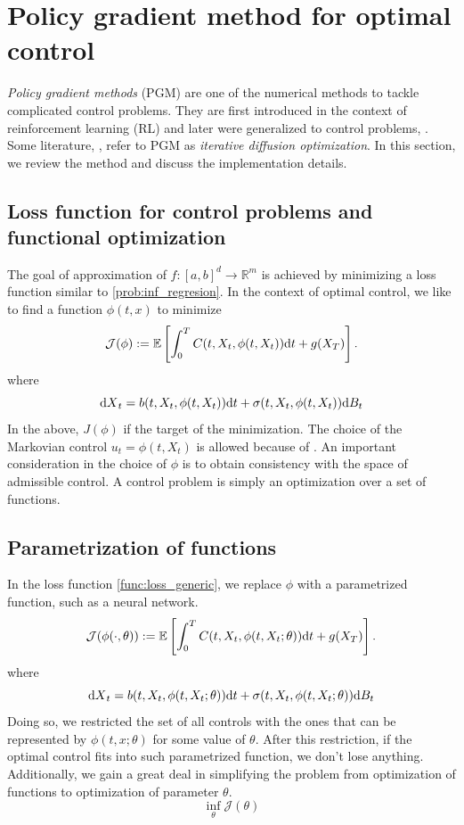 \documentclass[11pt]{book}
\newcommand{\dd}{\text{\normalfont d}}
\newcommand{\dt}{\text{\normalfont d}t}
\newcommand{\dX}{\text{\normalfont d}X}
\begin{document}
\section{Policy gradient method for optimal control}
\emph{Policy gradient methods} (PGM) are one of the numerical methods to tackle complicated control problems. They are first introduced in the context of reinforcement learning (RL) and later were generalized to control problems, \citet{Powell19}. Some literature, \citet{NR21}, refer to PGM as \emph{iterative diffusion optimization}. In this section, we review the method and discuss the implementation details. 
\subsection{Loss function for control problems and functional optimization}
The goal of  approximation of $f:[a,b]^d\to\mathbb{R}^m$ is achieved by minimizing a loss function similar to \eqref{prob:inf_regresion}. 
In the context of optimal control, we like to find a function $\phi(t,x)$ to minimize
\begin{equation}\label{func:loss_generic}
{\mathcal{J}}(\phi):=\mathbb{E}\left[\int_0^T C(t,X_t,\phi(t,X_t)){{\dt}}+g(X_T)\right].
\end{equation}
where 
\[
{\dX}_t =b(t,X_t,\phi(t,X_t)){{\dt}}+\sigma(t,X_t,\phi(t,X_t)){\dd}B_t
\]
In the above, $J(\phi)$ if the target of the minimization. The choice of the Markovian control $u_t=\phi(t,X_t)$ is allowed because of \citet{el1987compactification,haussmann1986existence}. An important consideration in the choice of $\phi$ is to obtain consistency with the space of admissible control. 
A control problem is simply an optimization over a set of functions.
\subsection{Parametrization of functions}
In the loss function \eqref{func:loss_generic}, we replace $\phi$ with a parametrized function, such as  a neural network.
\begin{equation}\label{func:loss_parametrized}
{\mathcal{J}}(\phi(\cdot,\theta)):=\mathbb{E}\left[\int_0^T C(t,X_t,\phi(t,X_t;\theta)){{\dt}}+g(X_T)\right].
\end{equation}
where 
\[
{\dX}_t =b(t,X_t,\phi(t,X_t;\theta)){{\dt}}+\sigma(t,X_t,\phi(t,X_t;\theta)){\dd}B_t
\]
Doing so, we restricted the set of all controls with the ones that can be represented by $\phi(t,x;\theta)$ for some value of $\theta$. After this restriction, if the optimal control fits into such parametrized function, we don't lose anything. Additionally, we gain a great deal in simplifying the problem from optimization of functions to optimization of parameter $\theta$.
\[
\inf_{\theta}\mathcal{J}(\theta)
\]
\end{document}
